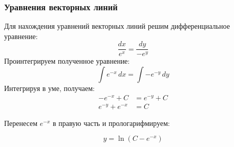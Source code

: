 \begin{frame}\frametitle{Уравнения векторных линий}

Для нахождения уравнений векторных линий решим дифференциальное уравнение:
  \begin{equation}
    \frac{dx}{e^x} = \frac{dy}{-e^y}
    \label{eq:vec_lines}
  \end{equation}
Проинтегрируем полученное уравнение:
  \begin{equation}
    \int e^{-x} \, dx = \int -e^{-y} \, dy
    \label{eq:vec_lines_int}
  \end{equation}
Интегрируя в уме, получаем:
  \begin{align*}
    -e^{-x} + C       &= e^{-y} + C \\
    e^{-y}  + e^{-x}   &= C
    \label{eq:vec_lines_integrated}
  \end{align*}

  Перенесем \(e^{-x}\) в правую часть и прологарифмируем:

  \begin{equation}
    y = \ln(C - e^{-x})
    \label{eq:vec_lines_final}
  \end{equation}

\end{frame}
